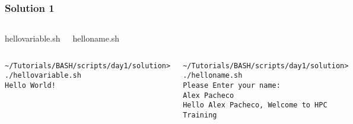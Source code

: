 \documentclass[slidestop,mathserif,compress,xcolor=svgnames]{beamer}
\newenvironment{eblock}[0]
{
\begin{beamerboxesrounded}[upper=uppercol2,lower=lowercol2,shadow=true]}
{\end{beamerboxesrounded}}
\begin{document}
\begin{frame}[fragile]
  \frametitle{\small Solution 1}
  \begin{columns}
    \begin{eblock}{hellovariable.sh}
      
    \end{eblock}
    \begin{eblock}{helloname.sh}
      
    \end{eblock}
  \end{columns}
  \begin{columns}
    \begin{eblock}{}
      \begin{lstlisting}[basicstyle=\fontsize{4}{4.5}\selectfont\ttfamily]
~/Tutorials/BASH/scripts/day1/solution> ./hellovariable.sh 
Hello World!
      \end{lstlisting}
    \end{eblock}
    \begin{eblock}{}
      \begin{lstlisting}[basicstyle=\fontsize{4}{4.5}\selectfont\ttfamily]
~/Tutorials/BASH/scripts/day1/solution> ./helloname.sh 
Please Enter your name:
Alex Pacheco
Hello Alex Pacheco, Welcome to HPC Training
      \end{lstlisting}
    \end{eblock}
  \end{columns}
\end{frame}
\end{document}
